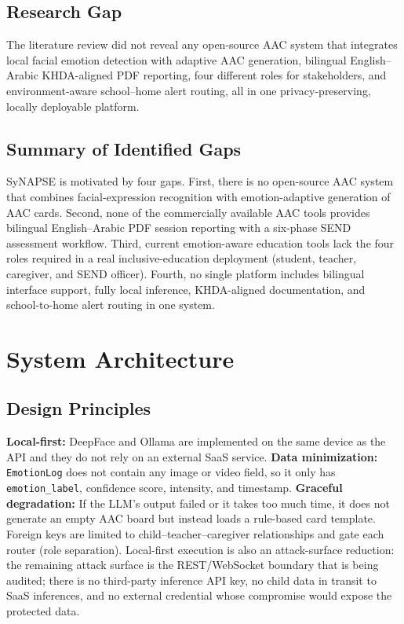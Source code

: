 \documentclass[conference]{IEEEtran}
\begin{document}
\subsection{Research Gap}
The literature review did not reveal any open-source AAC system that integrates local facial emotion detection with adaptive AAC generation, bilingual English--Arabic KHDA-aligned PDF reporting, four different roles for stakeholders, and environment-aware school--home alert routing, all in one privacy-preserving, locally deployable platform.

\subsection{Summary of Identified Gaps}
SyNAPSE is motivated by four gaps. First, there is no open-source AAC system that combines facial-expression recognition with emotion-adaptive generation of AAC cards. Second, none of the commercially available AAC tools provides bilingual English--Arabic PDF session reporting with a six-phase SEND assessment workflow. Third, current emotion-aware education tools lack the four roles required in a real inclusive-education deployment (student, teacher, caregiver, and SEND officer). Fourth, no single platform includes bilingual interface support, fully local inference, KHDA-aligned documentation, and school-to-home alert routing in one system.

\section{System Architecture}
\subsection{Design Principles}
\textbf{Local-first:} DeepFace and Ollama are implemented on the same device as the API and they do not rely on an external SaaS service. \textbf{Data minimization:} \texttt{EmotionLog} does not contain any image or video field, so it only has \texttt{emotion\_label}, confidence score, intensity, and timestamp. \textbf{Graceful degradation:} If the LLM's output failed or it takes too much time, it does not generate an empty AAC board but instead loads a rule-based card template. Foreign keys are limited to child--teacher--caregiver relationships and gate each router (role separation). Local-first execution is also an attack-surface reduction: the remaining attack surface is the REST/WebSocket boundary that is being audited; there is no third-party inference API key, no child data in transit to SaaS inferences, and no external credential whose compromise would expose the protected data.
\end{document}
